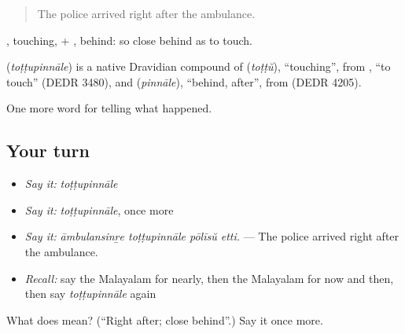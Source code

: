 \begin{quote}
The police arrived right after the ambulance.
\end{quote}

, touching, + , behind: so close behind as to touch.

\begin{cousinweb}
\textbf{} (\emph{toṭṭupinnāle}) is a native Dravidian compound of  (\emph{toṭṭŭ}), \textquotedblleft{}touching\textquotedblright{}, from , \textquotedblleft{}to touch\textquotedblright{} (DEDR 3480), and  (\emph{pinnāle}), \textquotedblleft{}behind, after\textquotedblright{}, from  (DEDR 4205).
\end{cousinweb}

\begin{grammarlens}[title={What you've built}]
One more word for telling what happened.
\end{grammarlens}

\subsection*{Your turn}
\begin{itemize}
\raggedright
  \item \emph{Say it:} \emph{toṭṭupinnāle}
  \item \emph{Say it:} \emph{toṭṭupinnāle}, once more
  \item \emph{Say it:} \emph{āmbulansinṟe toṭṭupinnāle pōlīsŭ etti.} — The police arrived right after the ambulance.
  \item \emph{Recall:} say the Malayalam for nearly, then the Malayalam for now and then, then say \emph{toṭṭupinnāle} again
\end{itemize}

\begin{tcolorbox}[breakable,colback=teal!4,colframe=teal!35!black,title={Before you move on}]
What does  mean? (\textquotedblleft{}Right after; close behind\textquotedblright{}.) Say it once more.
\end{tcolorbox}
